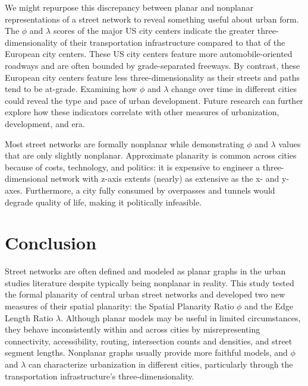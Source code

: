 \documentclass[Afour,sageh,times]{sagej}
\begin{document}
We might repurpose this discrepancy between planar and nonplanar representations of a street network to reveal something useful about urban form. The $\phi$ and $\lambda$ scores of the major US city centers indicate the greater three-dimensionality of their transportation infrastructure compared to that of the European city centers. These US city centers feature more automobile-oriented roadways and are often bounded by grade-separated freeways. By contrast, these European city centers feature less three-dimensionality as their streets and paths tend to be at-grade. Examining how $\phi$ and $\lambda$ change over time in different cities could reveal the type and pace of urban development. Future research can further explore how these indicators correlate with other measures of urbanization, development, and era.

Most street networks are formally nonplanar while demonstrating $\phi$ and $\lambda$ values that are only slightly nonplanar. Approximate planarity is common across cities because of costs, technology, and politics: it is expensive to engineer a three-dimensional network with z-axis extents (nearly) as extensive as the x- and y-axes. Furthermore, a city fully consumed by overpasses and tunnels would degrade quality of life, making it politically infeasible.

\section{Conclusion}

Street networks are often defined and modeled as planar graphs in the urban studies literature despite typically being nonplanar in reality. This study tested the formal planarity of central urban street networks and developed two new measures of their spatial planarity: the Spatial Planarity Ratio $\phi$ and the Edge Length Ratio $\lambda$. Although planar models may be useful in limited circumstances, they behave inconsistently within and across cities by misrepresenting connectivity, accessibility, routing, intersection counts and densities, and street segment lengths. Nonplanar graphs usually provide more faithful models, and $\phi$ and $\lambda$ can characterize urbanization in different cities, particularly through the transportation infrastructure's three-dimensionality.




\end{document}
